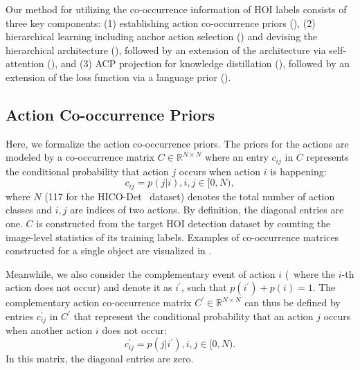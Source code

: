 

{Our method for utilizing the co-occurrence information of HOI labels consists of three key components:} 
(1) establishing action co-occurrence priors (), (2) hierarchical learning including anchor action selection () and devising the hierarchical architecture (), followed by an extension of the architecture via self-attention (), and 
(3) {ACP projection for knowledge distillation} (), followed by an extension of the loss function via a language prior ().







\subsection{Action Co-occurrence Priors}
\label{sec.prior}











{Here, we formalize the action co-occurrence priors.} 
The priors for the actions are modeled by a co-occurrence matrix $C \in \mathbb{R}^{N\times N}$ where an entry $c_{ij}$ in $C$ represents the conditional probability that action $j$ occurs when action $i$ is happening: 
\begin{equation}
    c_{ij} = p(j|i), i,j \in [0, N),
\label{eq:acp}
\end{equation}
where $N$ 
(117 for the HICO-Det~\cite{chao2018learning} dataset) 
denotes the total number of action classes and $i,j$ are indices of two actions. 
By definition, the diagonal entries are one.
$C$ is constructed from the target HOI detection dataset by counting the {image-level} statistics of its training labels.
Examples of co-occurrence matrices constructed for a single object are visualized in .




Meanwhile, we also consider the complementary event of action $i$ (\ie~where the $i$-th action does not occur) and denote it as $i^{'}$, such that $p(i^{'}) + p(i) = 1$.
The complementary action co-occurrence matrix $C^{'} \in \mathbb{R}^{N\times N}$ can thus be defined by entries $c_{ij}^{'}$ in $C^{'}$ that represent the conditional probability that an action $j$ occurs when another action $i$ does not occur: 
\begin{equation}
    c^{'}_{ij} = p(j|i^{'}), i,j \in [0, N).
\end{equation}
In this matrix, the diagonal entries are zero.



